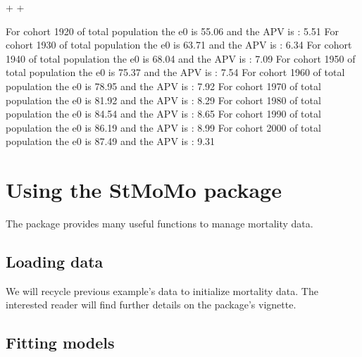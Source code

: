 \documentclass[nojss]{jss}
\begin{document}
\begin{Schunk}
\begin{Sinput}
{+ 		
+ 	}
\end{Sinput}
\begin{Soutput}
For cohort  1920 of total population the e0 is 55.06  and the APV is : 5.51 
For cohort  1930 of total population the e0 is 63.71  and the APV is : 6.34 
For cohort  1940 of total population the e0 is 68.04  and the APV is : 7.09 
For cohort  1950 of total population the e0 is 75.37  and the APV is : 7.54 
For cohort  1960 of total population the e0 is 78.95  and the APV is : 7.92 
For cohort  1970 of total population the e0 is 81.92  and the APV is : 8.29 
For cohort  1980 of total population the e0 is 84.54  and the APV is : 8.65 
For cohort  1990 of total population the e0 is 86.19  and the APV is : 8.99 
For cohort  2000 of total population the e0 is 87.49  and the APV is : 9.31 
\end{Soutput}
\end{Schunk}

\newpage
\section{Using the StMoMo package}

The  package provides many useful functions to manage mortality data.

\subsection{Loading data}

We will recycle previous example's data to initialize mortality data. The interested reader will find further details on the  package's vignette.

\begin{Schunk}
\end{Schunk}

\subsection{Fitting models}
\end{document}
